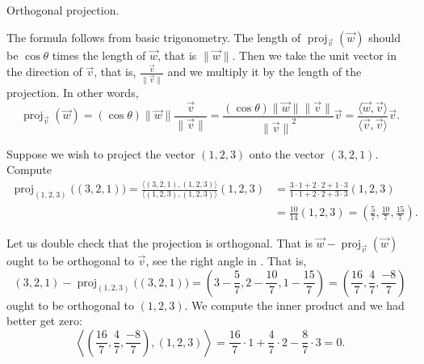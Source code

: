 \begin{myfig}
\capstart
{}
\caption{Orthogonal projection.\label{vec-orthoproj:fig}}
\end{myfig}

The formula follows from basic trigonometry.  The length of
$\operatorname{proj}_{\vec{v}}(\vec{w})$ should be
$\cos \theta$ times the length of $\vec{w}$, that is $\lVert\vec{w}\rVert$.
Then we take the unit vector in the direction of $\vec{v}$, that is,
$\frac{\vec{v}}{\lVert \vec{v} \rVert}$ and we multiply it by the length of
the projection.  In other words,
\begin{equation*}
\operatorname{proj}_{\vec{v}}(\vec{w})
=
(\cos \theta) \lVert \vec{w} \rVert
\frac{\vec{v}}{\lVert \vec{v} \rVert}
=
\frac{(\cos \theta) \lVert \vec{w} \rVert \lVert \vec{v} \rVert}{
{\lVert \vec{v} \rVert}^2
}
\vec{v}
=
\frac{\langle \vec{w}, \vec{v} \rangle}{
\langle \vec{v}, \vec{v} \rangle
}
\vec{v} .
\end{equation*}

\begin{example}
Suppose we wish to project the vector $(1,2,3)$ onto the vector $(3,2,1)$.
Compute
\begin{equation*}
\begin{split}
\operatorname{proj}_{(1,2,3)} \bigl( (3,2,1) \bigr)
=
\frac{\langle (3,2,1) , (1,2,3) \rangle}{\langle (1,2,3) , (1,2,3) \rangle}
(1,2,3)
& =
\frac{3 \cdot 1 + 2 \cdot 2 + 1 \cdot 3}{ 1 \cdot 1 + 2 \cdot 2 + 3 \cdot 3}
(1,2,3)
\\
& =
\frac{10}{14}
(1,2,3)
=
\left(\frac{5}{7},\frac{10}{7},\frac{15}{7}\right) .
\end{split}
\end{equation*}

Let us double check that the projection is orthogonal.  That is
$\vec{w}-\operatorname{proj}_{\vec{v}}(\vec{w})$ ought to be orthogonal to
$\vec{v}$, see the right angle in .  That is,
\begin{equation*}
(3,2,1) - \operatorname{proj}_{(1,2,3)} \bigl( (3,2,1) \bigr)
=
\left(3-\frac{5}{7},2-\frac{10}{7},1-\frac{15}{7}\right)
=
\left(\frac{16}{7},\frac{4}{7},\frac{-8}{7}\right)
\end{equation*}
ought to be orthogonal to $(1,2,3)$.  We compute the inner product and we
had better get zero:
\begin{equation*}
\left\langle
\left(\frac{16}{7},\frac{4}{7},\frac{-8}{7}\right)
,
(1,2,3)
\right\rangle
=
\frac{16}{7} \cdot 1 + \frac{4}{7} \cdot 2 -\frac{8}{7} \cdot 3
=
0 .
\end{equation*}
\end{example}

